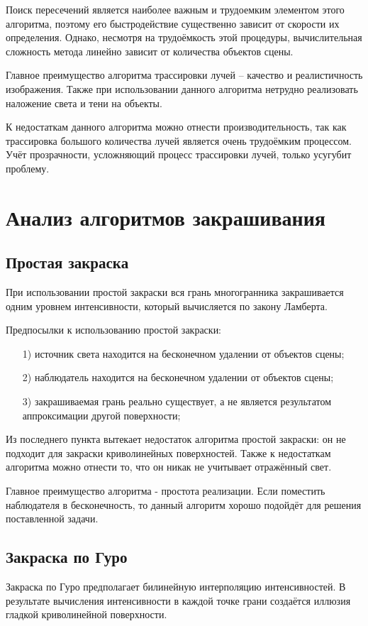 Поиск пересечений является наиболее важным и трудоемким элементом этого алгоритма, поэтому его быстродействие существенно зависит от скорости их определения. Однако, несмотря на трудоёмкость этой процедуры, вычислительная сложность метода линейно зависит от количества объектов сцены. 

Главное преимущество алгоритма трассировки лучей – качество и реалистичность изображения. Также при использовании данного алгоритма нетрудно реализовать наложение света и тени на объекты.

К недостаткам данного алгоритма можно отнести производительность, так как трассировка большого количества лучей является очень трудоёмким процессом. Учёт прозрачности, усложняющий процесс трассировки лучей, только усугубит проблему.

\section{Анализ алгоритмов закрашивания}
\subsection{Простая закраска}
При использовании простой закраски вся грань многогранника закрашивается одним уровнем интенсивности, который вычисляется по закону Ламберта.

Предпосылки к использованию простой закраски:
\begin{enumerate}
	\item[1)] источник света находится на бесконечном удалении от объектов сцены;
	\item[2)] наблюдатель находится на бесконечном удалении от объектов сцены;
	\item[3)] закрашиваемая грань реально существует, а не является результатом аппроксимации другой поверхности;
\end{enumerate}

Из последнего пункта вытекает недостаток алгоритма простой закраски: он не подходит для закраски криволинейных поверхностей. Также к недостаткам алгоритма можно отнести то, что он никак не учитывает отражённый свет.

Главное преимущество алгоритма - простота реализации. Если поместить наблюдателя в бесконечность, то данный алгоритм хорошо подойдёт для решения поставленной задачи.

\subsection{Закраска по Гуро}
Закраска по Гуро предполагает билинейную интерполяцию интенсивностей. В результате вычисления интенсивности в каждой точке грани создаётся иллюзия гладкой криволинейной поверхности.

